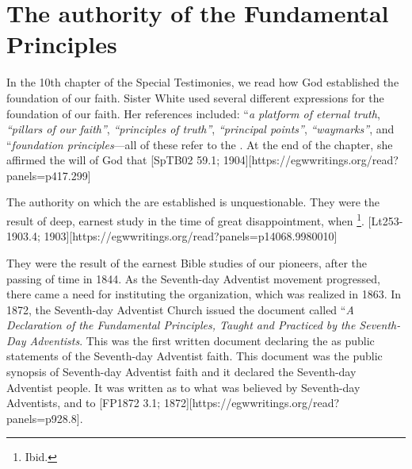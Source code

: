 \chapter{The authority of the Fundamental Principles} \label{chap:authority}

In the 10th chapter of the Special Testimonies, we read how God established the foundation of our faith. Sister White used several different expressions for the foundation of our faith. Her references included: “\textit{a platform of eternal truth}, \textit{“pillars of our faith”}, \textit{“principles of truth”}, \textit{“principal points”}, \textit{“waymarks”}, and “\textit{foundation principles}—all of these refer to the . At the end of the chapter, she affirmed the will of God that [SpTB02 59.1; 1904][https://egwwritings.org/read?panels=p417.299]

The authority on which the  are established is unquestionable. They were the result of deep, earnest study in the time of great disappointment, when \footnote{Ibid.}. [Lt253-1903.4; 1903][https://egwwritings.org/read?panels=p14068.9980010]

They were the result of the earnest Bible studies of our pioneers, after the passing of time in 1844. As the Seventh-day Adventist movement progressed, there came a need for instituting the organization, which was realized in 1863. In 1872, the Seventh-day Adventist Church issued the document called “\textit{A Declaration of the Fundamental Principles, Taught and Practiced by the Seventh-Day Adventists}. This was the first written document declaring the  as public statements of the Seventh-day Adventist faith. This document was the public synopsis of Seventh-day Adventist faith and it declared  the Seventh-day Adventist people. It was written  as to what was believed by Seventh-day Adventists,  and to [FP1872 3.1; 1872][https://egwwritings.org/read?panels=p928.8].

